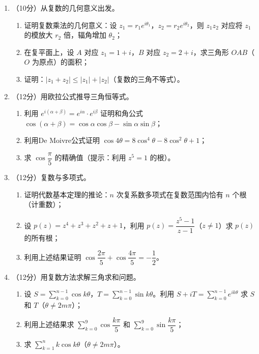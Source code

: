 \documentclass[12pt, a4paper]{ctexart}
\begin{document}
\begin{enumerate}[resume]

\item （10分）从复数的几何意义出发。

\begin{enumerate}[label=(\arabic*)]
    \item 证明复数乘法的几何意义：设 $z_1=r_1e^{i\theta_1}$，$z_2=r_2e^{i\theta_2}$，则 $z_1z_2$ 对应将 $z_1$ 的模放大 $r_2$ 倍，辐角增加 $\theta_2$；
    \item 在复平面上，设 $A$ 对应 $z_1=1+i$，$B$ 对应 $z_2=2+i$，求三角形 $OAB$（$O$ 为原点）的面积；
    \item 证明：$|z_1+z_2|\leq |z_1|+|z_2|$（复数的三角不等式）。
\end{enumerate}

\item （12分）用欧拉公式推导三角恒等式。

\begin{enumerate}[label=(\arabic*)]
    \item 利用 $e^{i(\alpha+\beta)}=e^{i\alpha}\cdot e^{i\beta}$ 证明和角公式 $\cos(\alpha+\beta)=\cos\alpha\cos\beta-\sin\alpha\sin\beta$；
    \item 利用De Moivre公式证明 $\cos 4\theta=8\cos^4\theta-8\cos^2\theta+1$；
    \item 求 $\cos\dfrac{\pi}{5}$ 的精确值（提示：利用 $z^5=1$ 的根）。
\end{enumerate}

\item （12分）复数与多项式。

\begin{enumerate}[label=(\arabic*)]
    \item 证明代数基本定理的推论：$n$ 次复系数多项式在复数范围内恰有 $n$ 个根（计重数）；
    \item 设 $p(z)=z^4+z^3+z^2+z+1$，利用 $p(z)=\dfrac{z^5-1}{z-1}$（$z\neq 1$）求 $p(z)$ 的所有根；
    \item 利用上述结果证明 $\cos\dfrac{2\pi}{5}+\cos\dfrac{4\pi}{5}=-\dfrac{1}{2}$。
\end{enumerate}

\item （12分）用复数方法求解三角求和问题。

\begin{enumerate}[label=(\arabic*)]
    \item 设 $S=\displaystyle\sum_{k=0}^{n-1}\cos k\theta$，$T=\displaystyle\sum_{k=0}^{n-1}\sin k\theta$。利用 $S+iT=\displaystyle\sum_{k=0}^{n-1}e^{ik\theta}$ 求 $S$ 和 $T$（$\theta\neq 2m\pi$）；
    \item 利用上述结果求 $\displaystyle\sum_{k=0}^{9}\cos\dfrac{k\pi}{5}$ 和 $\displaystyle\sum_{k=0}^{9}\sin\dfrac{k\pi}{5}$；
    \item 求 $\displaystyle\sum_{k=1}^{n}k\cos k\theta$（$\theta\neq 2m\pi$）。
\end{enumerate}


\end{enumerate}
\end{document}
